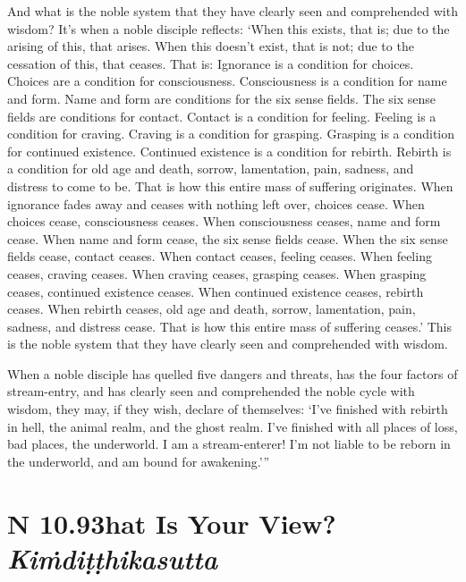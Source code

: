 \documentclass[12pt,openany]{book}%
\newcommand*{\suttatitleacronym}[1]{\smaller[2]{#1}\vspace*{.3em}}
\newcommand*{\suttatitletranslation}[1]{\linebreak{#1}}
\newcommand*{\suttatitleroot}[1]{\linebreak\smaller[2]\itshape{#1}}
\newcommand*{\tocacronym}[1]{\hspace*{-3.3em}{#1}\quad}
\newcommand*{\toctranslation}[1]{#1}
\newcommand*{\tocroot}[1]{(\textit{#1})}
\begin{document}
And what is the noble system that they have clearly seen and comprehended with wisdom? It’s when a noble disciple reflects: ‘When this exists, that is; due to the arising of this, that arises. When this doesn’t exist, that is not; due to the cessation of this, that ceases. That is: Ignorance is a condition for choices. Choices are a condition for consciousness. Consciousness is a condition for name and form. Name and form are conditions for the six sense fields. The six sense fields are conditions for contact. Contact is a condition for feeling. Feeling is a condition for craving. Craving is a condition for grasping. Grasping is a condition for continued existence. Continued existence is a condition for rebirth. Rebirth is a condition for old age and death, sorrow, lamentation, pain, sadness, and distress to come to be. That is how this entire mass of suffering originates. When ignorance fades away and ceases with nothing left over, choices cease. When choices cease, consciousness ceases. When consciousness ceases, name and form cease. When name and form cease, the six sense fields cease. When the six sense fields cease, contact ceases. When contact ceases, feeling ceases. When feeling ceases, craving ceases. When craving ceases, grasping ceases. When grasping ceases, continued existence ceases. When continued existence ceases, rebirth ceases. When rebirth ceases, old age and death, sorrow, lamentation, pain, sadness, and distress cease. That is how this entire mass of suffering ceases.’ This is the noble system that they have clearly seen and comprehended with wisdom. 

When a noble disciple has quelled five dangers and threats, has the four factors of stream-entry, and has clearly seen and comprehended the noble cycle with wisdom, they may, if they wish, declare of themselves: ‘I’ve finished with rebirth in hell, the animal realm, and the ghost realm. I’ve finished with all places of loss, bad places, the underworld. I am a stream-enterer! I’m not liable to be reborn in the underworld, and am bound for awakening.’” 

%
\section*{{\suttatitleacronym AN 10.93}{\suttatitletranslation What Is Your View? }{\suttatitleroot Kiṁdiṭṭhikasutta}}
\addcontentsline{toc}{section}{\tocacronym{AN 10.93} \toctranslation{What Is Your View? } \tocroot{Kiṁdiṭṭhikasutta}}
\end{document}

